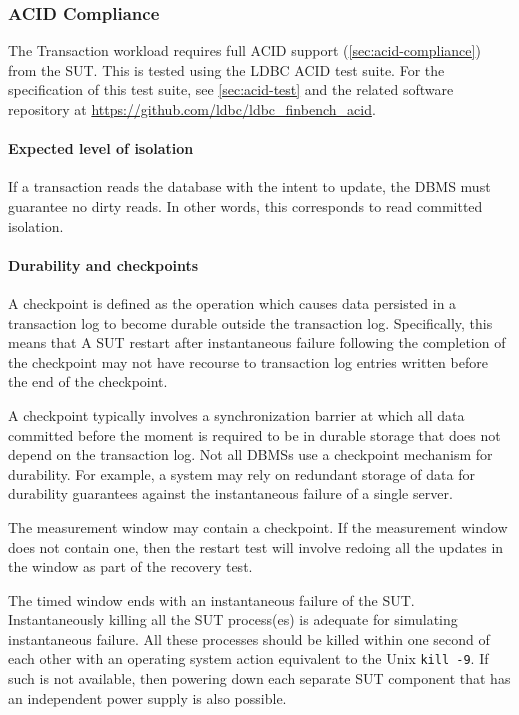 \subsubsection{ACID Compliance}
\label{sec:transaction-workload-acid-compliance}

The Transaction workload requires full ACID support (\autoref{sec:acid-compliance}) from the SUT.
This is tested using the LDBC ACID test suite.
For the specification of this test suite, see \autoref{sec:acid-test} and the related software repository at \url{https://github.com/ldbc/ldbc_finbench_acid}.

\paragraph{Expected level of isolation}
If a transaction reads the database with the intent to update, the DBMS must guarantee no dirty reads. In other words, this
corresponds to read committed isolation.

\paragraph{Durability and checkpoints}

A checkpoint is defined as the operation which causes data persisted in a transaction log to become durable outside the transaction log. Specifically, this means that A SUT restart after instantaneous failure following the completion of the checkpoint may not have recourse to transaction log entries written before the end of the checkpoint.

A checkpoint typically involves a synchronization barrier at which all data committed before the moment is required to be in durable storage that does not depend on the transaction log.
Not all DBMSs use a checkpoint mechanism for durability. For example, a system may rely on redundant storage of data for durability guarantees against the instantaneous failure of a single server.

The measurement window may contain a checkpoint. If the measurement window does not contain one, then the restart test will involve redoing all the updates in the window as part of the recovery test.

The timed window ends with an instantaneous failure of the SUT. Instantaneously killing all the SUT process(es) is adequate for simulating instantaneous failure. All these processes should be killed within one second of each other with an operating system action equivalent to the Unix \verb+kill -9+. If such is not available, then powering down each separate SUT component that has an independent power supply is also possible.

